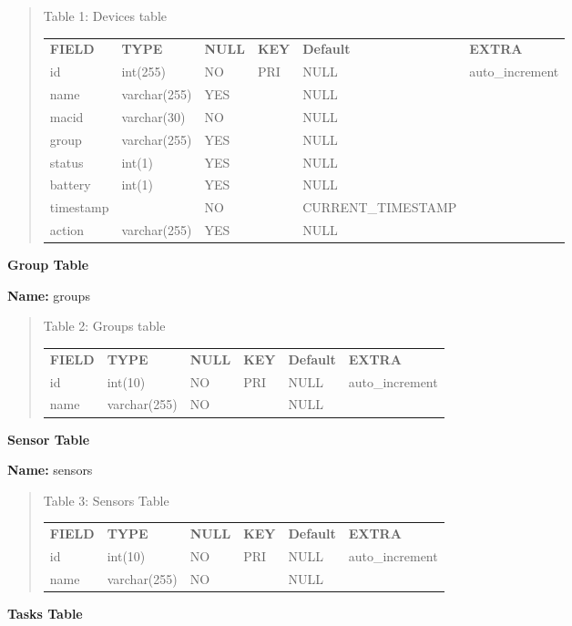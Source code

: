 \documentclass[16pt]{article}
\begin{document}
\begin{quote}

	\centering
	 \caption{Table 1: Devices table}
	\label{my-label}
	\begin{tabular}{llllll}
		{\bf FIELD} & {\bf TYPE}   & {\bf NULL} & {\bf KEY} & {\bf Default}      & {\bf EXTRA}     \\
		id          & int(255)     & NO         & PRI       & NULL               & auto\_increment \\
		name        & varchar(255) & YES        &           & NULL               &                 \\
		macid       & varchar(30)  & NO         &           & NULL               &                 \\
		group       & varchar(255) & YES        &           & NULL               &                 \\
		status      & int(1)       & YES        &           & NULL               &                 \\
		battery     & int(1)       & YES        &           & NULL               &                 \\
		timestamp   &              & NO         &           & CURRENT\_TIMESTAMP &                 \\
		action      & varchar(255) & YES        &           & NULL               &                
	\end{tabular}
	
\end{quote}
\textbf{Group Table}

\textbf{Name:} groups

\begin{quote}
	\centering
	\caption{Table 2: Groups table}
	\label{my-label}
	\begin{tabular}{llllll}
		{\bf FIELD} & {\bf TYPE}   & {\bf NULL} & {\bf KEY} & {\bf Default} & {\bf EXTRA}     \\
		id          & int(10)      & NO         & PRI       & NULL          & auto\_increment \\
		name        & varchar(255) & NO         &           & NULL          &                
	\end{tabular}

\end{quote}
\textbf{Sensor Table}

\textbf{Name:} sensors

\begin{quote}
	\centering
	\caption{Table 3: Sensors Table}
	\label{my-label}
	\begin{tabular}{llllll}
		{\bf FIELD} & {\bf TYPE}   & {\bf NULL} & {\bf KEY} & {\bf Default} & {\bf EXTRA}     \\
		id          & int(10)      & NO         & PRI       & NULL          & auto\_increment \\
		name        & varchar(255) & NO         &           & NULL          &                
	\end{tabular}

\end{quote}
\textbf{Tasks Table}
\end{document}
